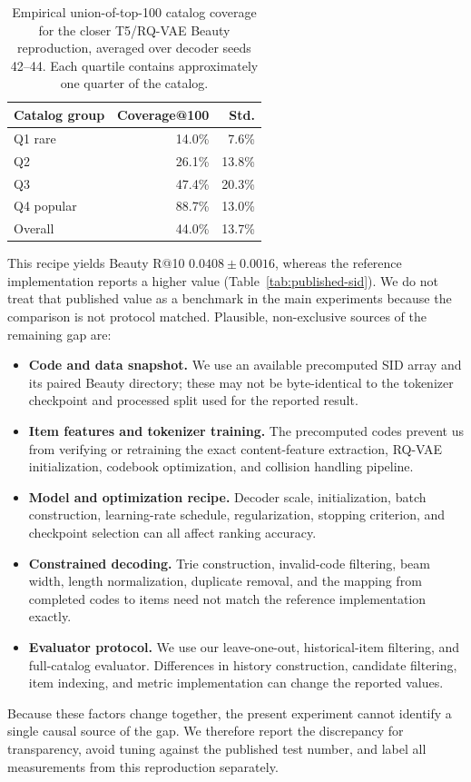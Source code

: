 \documentclass[letterpaper]{article}
\begin{document}
\begin{table}[!htbp]
\centering
\small
\begin{tabular}{lrr}
\toprule
Catalog group & Coverage@100 & Std. \\
\midrule
Q1 rare & 14.0\% & 7.6\% \\
Q2 & 26.1\% & 13.8\% \\
Q3 & 47.4\% & 20.3\% \\
Q4 popular & 88.7\% & 13.0\% \\
\midrule
Overall & 44.0\% & 13.7\% \\
\bottomrule
\end{tabular}
\caption{Empirical union-of-top-100 catalog coverage for the closer T5/RQ-VAE
Beauty reproduction, averaged over decoder seeds 42--44. Each quartile
contains approximately one quarter of the catalog.}
\label{tab:faithful-coverage}
\end{table}

This recipe yields Beauty R@10 $0.0408\pm0.0016$, whereas the reference
implementation reports a higher value (Table~\ref{tab:published-sid}). We do
not treat that published value as a benchmark in the main experiments because
the comparison is not protocol matched. Plausible, non-exclusive sources of
the remaining gap are:
\begin{itemize}
    \item \textbf{Code and data snapshot.} We use an available precomputed SID
    array and its paired Beauty directory; these may not be byte-identical to
    the tokenizer checkpoint and processed split used for the reported result.
    \item \textbf{Item features and tokenizer training.} The precomputed codes
    prevent us from verifying or retraining the exact content-feature
    extraction, RQ-VAE initialization, codebook optimization, and collision
    handling pipeline.
    \item \textbf{Model and optimization recipe.} Decoder scale, initialization,
    batch construction, learning-rate schedule, regularization, stopping
    criterion, and checkpoint selection can all affect ranking accuracy.
    \item \textbf{Constrained decoding.} Trie construction, invalid-code
    filtering, beam width, length normalization, duplicate removal, and the
    mapping from completed codes to items need not match the reference
    implementation exactly.
    \item \textbf{Evaluator protocol.} We use our leave-one-out, historical-item
    filtering, and full-catalog evaluator. Differences in history construction,
    candidate filtering, item indexing, and metric implementation can change
    the reported values.
\end{itemize}
Because these factors change together, the present experiment cannot identify
a single causal source of the gap. We therefore report the discrepancy for
transparency, avoid tuning against the published test number, and label all
measurements from this reproduction separately.
\end{document}
